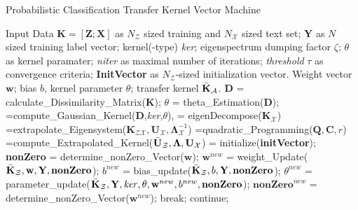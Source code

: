 \begin{algorithm}[!]
	\caption{Probabilistic Classification Transfer Kernel Vector Machine }\label{PCTKVMComplete}
	\begin{algorithmic}[1]
		\Require Input Data $\mathbf{K} = [\mathbf{Z};\mathbf{X}]$ as $N_\mathcal{Z}$ sized training and $N_\mathcal{X}$ sized text set; $\mathbf{Y}$ as $N$ sized training label vector; kernel(-type) \textit{ker}; eigenspectrum dumping factor $\zeta$; $\theta$ as kernel paramater; \textit{niter} as maximal number of iterations; \textit{threshold} $\tau$ as convergence criteria; \textbf{InitVector} as $N_\mathcal{Z}$-sized initialization vector.
		\Ensure Weight vector $\mathbf{w}$; bias $b$, kernel parameter $\theta$; transfer kernel $\bar{\mathbf{K}}_\mathcal{A}$.
		\State $\mathbf{D}$ = calculate\_Dissimilarity\_Matrix($\mathbf{K}$);
		\State $\theta$ = theta\_Estimation($\mathbf{D}$);  
		\EndIf
		=compute\_Gaussian\_Kernel($\mathbf{D}$,\textit{ker},$\theta$),
		= eigenDecompose($\mathbf{K}_\mathcal{X}$)  
		 =extrapolate\_Eigensystem($\mathbf{K}_\mathcal{ZX},\mathbf{U}_\mathcal{X},\boldsymbol{\Lambda}_\mathcal{X}^{-1}$) 
		\State [$\boldsymbol{\Lambda}$]=quadratic\_Programming($\mathbf{Q},\mathbf{C},r$)  
		=compute\_Extrapolated\_Kernel($\bar{\mathbf{U}}_\mathcal{Z},\boldsymbol{\Lambda},\mathbf{U}_\mathcal{X}$) 
		\State	[$\mathbf{w},b$] = initialize(\textbf{initVector});
		\State \textbf{nonZero} = determine\_nonZero\_Vector($\mathbf{w}$); 
		\State $\mathbf{w}^{new}$ = weight\_Update($\bar{\mathbf{K}}_{\mathcal{Z}},\mathbf{w,Y,nonZero}$);   
		\State $b^{new}$ = bias\_update($\bar{\mathbf{K}}_{\mathcal{Z}},b\mathbf{,Y,nonZero}$); 
		\State $\theta^{new}$ = parameter\_update($\bar{\mathbf{K}}_{\mathcal{Z}},\mathbf{Y},\mathit{ker},\theta,\mathbf{w}^{new},b^{new},\mathbf{nonZero}$); 
		\State $\mathbf{nonZero}^{new}$ = determine\_nonZero\_Vector($\mathbf{w}^{new}$);
		\State break;
		\Else
		\State continue;
		\EndIf
		\EndFor
	\end{algorithmic}
\end{algorithm}

